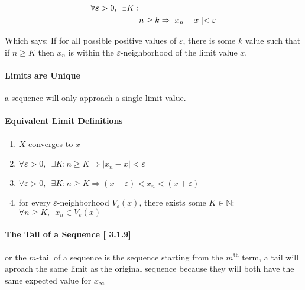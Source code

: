 \documentclass[class=article, crop=false]{standalone}
\begin{document}
\begin{align}
  \forall \varepsilon > 0, \enspace \exists K : & \notag \\
  & n \geq k \Rightarrow \mid x_{n} - x \mid < \varepsilon 
  \label{precicelimit}
\end{align}

Which says; If for all possible positive values of $\varepsilon$, there is some $k$ value such that if $n \geq K$ then $x_{n}$ is within the $\varepsilon$-neighborhood of the limit value $x$.


\paragraph{Limits are Unique} a sequence will only approach a single limit value.

\paragraph{Equivalent Limit Definitions}
\begin{enumerate}
  \item $X$ converges to $x$ \\
  \item $\forall \varepsilon > 0, \enspace \exists K : n\geq K \Rightarrow \mid x_{n} - x \mid < \varepsilon$
  \item $\forall \varepsilon > 0, \enspace \exists K : n\geq K \Rightarrow \left( x- \varepsilon \right) < x_{n} < \left( x + \varepsilon \right)$
  \item for every $\varepsilon$-neighborhood $V_{\varepsilon}\left( x \right)$, there exists some $K \in \mathbb{N}$:
    \subitem $\forall n \geq K, \enspace x_{n} \in V_{\varepsilon}\left( x \right)$
\end{enumerate}

\paragraph{The Tail of a Sequence [ 3.1.9]} or the $m$-tail of a sequence is the sequence starting from the $m^{\text{th}}$ term, a tail will aproach the same limit as the original sequence because they will both have the same expected value for $x_{\infty}$
\end{document}
